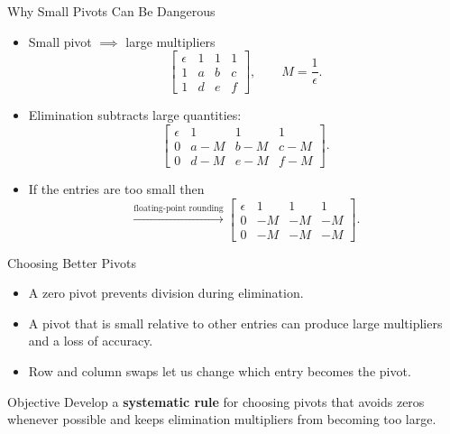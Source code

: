 \documentclass[10pt]{beamer}
\begin{document}

\begin{frame}{Why Small Pivots Can Be Dangerous}

\begin{itemize}
    \item Small pivot $\implies$ large multipliers
    \[
    \left[
    \begin{array}{c|ccc}
        \boxed{\epsilon} & 1 & 1 & 1\\
        1 & a & b & c\\
        1 & d & e & f
    \end{array}
    \right],
    \qquad M=\frac{1}{\epsilon}.
    \]

    \item Elimination subtracts large quantities:
    \[
    \left[
    \begin{array}{c|ccc}
        \boxed{\epsilon} & 1 & 1 & 1\\
        0 & a-M & b-M & c-M\\
        0 & d-M & e-M & f-M
    \end{array}
    \right].
    \]

\item If the entries are too small then
    \[
    \xrightarrow{\text{floating-point rounding}}
    \left[
    \begin{array}{c|ccc}
        \boxed{\epsilon} & 1 & 1 & 1\\
        0 & -M & -M & -M\\
        0 & -M & -M & -M
    \end{array}
    \right].
    \]
\end{itemize}


\end{frame}

\begin{frame}{Choosing Better Pivots}

\begin{itemize}
    \item A zero pivot prevents division during elimination.

    \item A pivot that is small relative to other entries
    can produce large multipliers and a loss of accuracy.

    \item Row and column swaps let us change which
    entry becomes the pivot.
\end{itemize}

\vfill

\begin{block}{Objective}
Develop a \textbf{systematic rule} for choosing pivots
that avoids zeros whenever possible and keeps
elimination multipliers from becoming too large.
\end{block}

\vfill


\end{frame}
\end{document}
